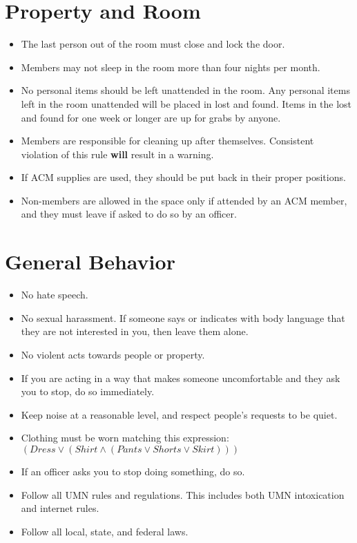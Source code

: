 





\section{Property and Room}
\begin{itemize}
	\item The last person out of the room must close and lock the door.
	\item Members may not sleep in the room more than four nights per month.
	\item No personal items should be left unattended in the room. Any personal items left in the room unattended will be placed in lost and found. Items in the lost and found for one week or longer are up for grabs by anyone.
	\item Members are responsible for cleaning up after themselves. Consistent violation of this rule \textbf{will} result in a warning.
	\item If ACM supplies are used, they should be put back in their proper positions.
	\item Non-members are allowed in the space only if attended by an ACM member, and they must leave if asked to do so by an officer.
\end{itemize}

\section{General Behavior}
\begin{itemize}
	\item No hate speech.
	\item No sexual harassment. If someone says or indicates with body language that they are not interested in you, then leave them alone.
	\item No violent acts towards people or property.
	\item If you are acting in a way that makes someone uncomfortable and they ask you to stop, do so immediately.
	\item Keep noise at a reasonable level, and respect people’s requests to be quiet.
	\item Clothing must be worn matching this expression: $(Dress \lor (Shirt \land (Pants \lor Shorts \lor Skirt)))$
	\item If an officer asks you to stop doing something, do so.
	\item Follow all UMN rules and regulations. This includes both UMN intoxication and internet rules.
	\item Follow all local, state, and federal laws.
\end{itemize}

